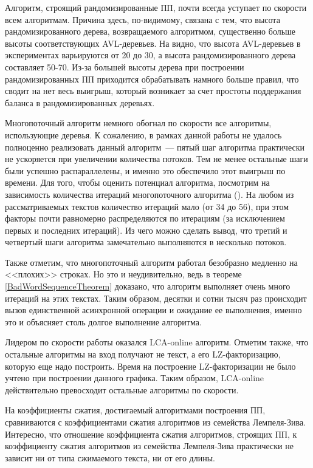 \documentclass[14pt]{article}
\begin{document}
Алгоритм, строящий рандомизированные ПП, почти всегда уступает по скорости всем алгоритмам. Причина здесь, по-видимому, связана с тем,
что высота рандомизированного дерева, возвращаемого алгоритмом, существенно больше высоты соответствующих AVL-деревьев.
На  видно, что высота AVL-деревьев в экспериментах варьируются от 20 до 30,
а высота рандомизированного дерева составляет 50-70. Из-за большей высоты дерева при построении рандомизированных
ПП приходится обрабатывать намного больше правил, что сводит на нет весь выигрыш, который возникает за счет простоты поддержания
баланса в рандомизированных деревьях.

Многопоточный алгоритм немного обогнал по скорости все алгоритмы, использующие деревья. К сожалению, в рамках данной работы
не удалось полноценно реализовать данный алгоритм~--- пятый шаг алгоритма практически не ускоряется при увеличении количества потоков.
Тем не менее остальные шаги были успешно распараллелены, и именно это обеспечило этот выигрыш по времени. Для того, чтобы оценить
потенциал алгоритма, посмотрим на зависимость количества итераций многопоточного алгоритма ().
На любом из рассматриваемых текстов количество итераций мало (от 34 до 56), при этом факторы почти равномерно распределяются
по итерациям (за исключением первых и последних итераций). Из чего можно сделать вывод, что третий и четвертый шаги алгоритма
замечательно выполняются в несколько потоков.

Также отметим, что многопоточный алгоритм работал безобразно медленно на <<плохих>> строках. Но это и неудивительно,
ведь в теореме \ref{BadWordSequenceTheorem} доказано, что алгоритм выполняет очень много итераций на этих текстах.
Таким образом, десятки и сотни тысяч раз происходит вызов единственной асинхронной операции и ожидание ее выполнения,
именно это и объясняет столь долгое выполнение алгоритма.

Лидером по скорости работы оказался LCA-online алгоритм. Отметим также, что остальные алгоритмы на вход получают
не текст, а его LZ-факторизацию, которую еще надо построить. Время на построение LZ-факторизации не было учтено при построении данного графика.
Таким образом, LCA-online действительно превосходит остальные алгоритмы по скорости.

На  коэффициенты сжатия, достигаемый алгоритмами построения ПП,
сравниваются с коэффициентами сжатия алгоритмов из семейства Лемпеля-Зива. Интересно, что отношение коэффициента сжатия алгоритмов,
строящих ПП, к коэффициенту сжатия алгоритмов из семейства Лемпеля-Зива практически не зависит ни от типа сжимаемого текста, ни от его длины.
\end{document}
